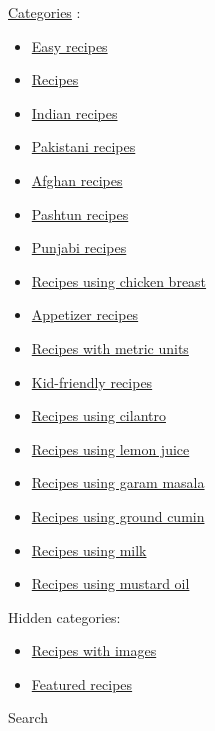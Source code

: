 \documentclass[11pt,a4paper]{article}
\begin{document}
\href{https://en.wikibooks.org/wiki/Special:Categories}{Categories} :

\begin{itemize}
\item \href{https://en.wikibooks.org/wiki/Category:Easy\_recipes}{Easy recipes}
\item \href{https://en.wikibooks.org/wiki/Category:Recipes}{Recipes}
\item \href{https://en.wikibooks.org/wiki/Category:Indian\_recipes}{Indian recipes}
\item \href{https://en.wikibooks.org/wiki/Category:Pakistani\_recipes}{Pakistani recipes}
\item \href{https://en.wikibooks.org/wiki/Category:Afghan\_recipes}{Afghan recipes}
\item \href{https://en.wikibooks.org/wiki/Category:Pashtun\_recipes}{Pashtun recipes}
\item \href{https://en.wikibooks.org/wiki/Category:Punjabi\_recipes}{Punjabi recipes}
\item \href{https://en.wikibooks.org/wiki/Category:Recipes\_using\_chicken\_breast}{Recipes using chicken breast}
\item \href{https://en.wikibooks.org/wiki/Category:Appetizer\_recipes}{Appetizer recipes}
\item \href{https://en.wikibooks.org/wiki/Category:Recipes\_with\_metric\_units}{Recipes with metric units}
\item \href{https://en.wikibooks.org/wiki/Category:Kid-friendly\_recipes}{Kid-friendly recipes}
\item \href{https://en.wikibooks.org/wiki/Category:Recipes\_using\_cilantro}{Recipes using cilantro}
\item \href{https://en.wikibooks.org/wiki/Category:Recipes\_using\_lemon\_juice}{Recipes using lemon juice}
\item \href{https://en.wikibooks.org/wiki/Category:Recipes\_using\_garam\_masala}{Recipes using garam masala}
\item \href{https://en.wikibooks.org/wiki/Category:Recipes\_using\_ground\_cumin}{Recipes using ground cumin}
\item \href{https://en.wikibooks.org/wiki/Category:Recipes\_using\_milk}{Recipes using milk}
\item \href{https://en.wikibooks.org/wiki/Category:Recipes\_using\_mustard\_oil}{Recipes using mustard oil}
\end{itemize}

Hidden categories:

\begin{itemize}
\item \href{https://en.wikibooks.org/wiki/Category:Recipes\_with\_images}{Recipes with images}
\item \href{https://en.wikibooks.org/wiki/Category:Featured\_recipes}{Featured recipes}
\end{itemize}

Search
\end{document}
